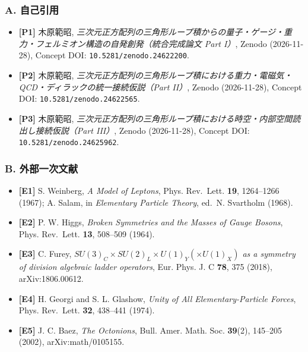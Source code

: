 \documentclass[
  a4paper,
]{ltjsarticle}
\providecommand{\tightlist}{%
  \setlength{\itemsep}{0pt}\setlength{\parskip}{0pt}}
\begin{document}
\subsubsection{A. 自己引用}\label{a.-ux81eaux5df1ux5f15ux7528}

\begin{itemize}
\tightlist
\item
  \textbf{{[}P1{]}} 木原範昭,
  \emph{三次元正方配列の三角形ループ積からの量子・ゲージ・重力・フェルミオン構造の自発創発（統合完成論文
  Part I）}, Zenodo (2026-11-28), Concept DOI:
  \texttt{10.5281/zenodo.24622200}.
\item
  \textbf{{[}P2{]}} 木原範昭,
  \emph{三次元正方配列の三角形ループ積における重力・電磁気・QCD・ディラックの統一接続仮説（Part
  II）}, Zenodo (2026-11-28), Concept DOI:
  \texttt{10.5281/zenodo.24622565}.
\item
  \textbf{{[}P3{]}} 木原範昭,
  \emph{三次元正方配列の三角形ループ積における時空・内部空間読出し接続仮説（Part
  III）}, Zenodo (2026-11-28), Concept DOI:
  \texttt{10.5281/zenodo.24625962}.
\end{itemize}

\subsubsection{B.
外部一次文献}\label{b.-ux5916ux90e8ux4e00ux6b21ux6587ux732e}

\begin{itemize}
\tightlist
\item
  \textbf{{[}E1{]}} S. Weinberg, \emph{A Model of Leptons}, Phys.
  Rev.~Lett. \textbf{19}, 1264--1266 (1967); A. Salam, in
  \emph{Elementary Particle Theory}, ed.~N. Svartholm (1968).
\item
  \textbf{{[}E2{]}} P. W. Higgs, \emph{Broken Symmetries and the Masses
  of Gauge Bosons}, Phys. Rev.~Lett. \textbf{13}, 508--509 (1964).
\item
  \textbf{{[}E3{]}} C. Furey,
  \emph{\(SU(3)_C \times SU(2)_L \times U(1)_Y (\times U(1)_X)\) as a
  symmetry of division algebraic ladder operators}, Eur. Phys. J. C
  \textbf{78}, 375 (2018), arXiv:1806.00612.
\item
  \textbf{{[}E4{]}} H. Georgi and S. L. Glashow, \emph{Unity of All
  Elementary-Particle Forces}, Phys. Rev.~Lett. \textbf{32}, 438--441
  (1974).
\item
  \textbf{{[}E5{]}} J. C. Baez, \emph{The Octonions}, Bull. Amer. Math.
  Soc. \textbf{39}(2), 145--205 (2002), arXiv:math/0105155.
\end{itemize}
\end{document}
